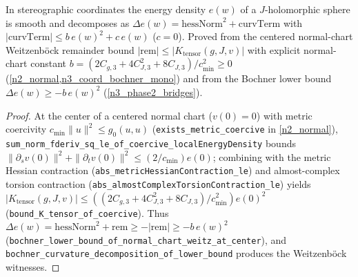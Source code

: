 \begin{theorem}
\label{cert_weitz}
\leanok
{}
In stereographic coordinates the energy density $e(w)$ of a $J$-holomorphic sphere is smooth and
decomposes as $\Delta e(w)=\mathrm{hessNorm}^2+\mathrm{curvTerm}$ with
$|\mathrm{curvTerm}|\le b\,e(w)^2+c\,e(w)$ ($c=0$). Proved from the centered normal-chart
Weitzenb\"ock remainder bound $|\mathrm{rem}|\le|K_{\mathrm{tensor}}(g,J,v)|$ with explicit normal-chart
constant $b=(2C_{g,3}+4C_{J,3}^2+8C_{J,3})/c_{\min}^2\ge0$ (\cref{n2_normal,n3_coord_bochner_mono})
and from the Bochner lower bound $\Delta e(w)\ge -b\,e(w)^2$ (\cref{n3_phase2_bridges}).
\end{theorem}
\begin{proof}\leanok At the center of a centered normal chart ($v(0)=0$) with metric coercivity
$c_{\min}\|u\|^2\le g_0(u,u)$ (\texttt{exists\_metric\_coercive} in \cref{n2_normal}),
\texttt{sum\_norm\_fderiv\_sq\_le\_of\_coercive\_localEnergyDensity} bounds
$\|\partial_s v(0)\|^2+\|\partial_t v(0)\|^2\le(2/c_{\min})e(0)$; combining with the metric Hessian
contraction (\texttt{abs\_metricHessianContraction\_le}) and almost-complex torsion contraction
(\texttt{abs\_almostComplexTorsionContraction\_le}) yields
$|K_{\mathrm{tensor}}(g,J,v)|\le((2C_{g,3}+4C_{J,3}^2+8C_{J,3})/c_{\min}^2)e(0)^2$
(\texttt{bound\_K\_tensor\_of\_coercive}). Thus $\Delta e(w)=\mathrm{hessNorm}^2+\mathrm{rem}\ge -|\mathrm{rem}|\ge -b\,e(w)^2$
(\texttt{bochner\_lower\_bound\_of\_normal\_chart\_weitz\_at\_center}), and
\texttt{bochner\_curvature\_decomposition\_of\_lower\_bound} produces the Weitzenb\"ock witnesses.\end{proof}

